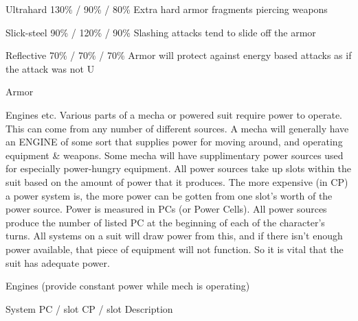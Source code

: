 \documentclass[twoside]{book}
\begin{document}
                      
                       Ultrahard   
                       130\% / 90\% / 80\%   
                         Extra hard armor fragments piercing
                         weapons 
                      
                      
                       Slick-steel   
                       90\% / 120\% / 90\%   
                         Slashing attacks tend to slide off the
                         armor 
                      
                      
                       Reflective   
                       70\% / 70\% / 70\%   
                          Armor will protect against energy based
                         attacks as if the attack was not U 
                      
                    
                  Armor  
                  
                
                
                Engines etc.  
                    Various parts of a mecha or powered suit
                   require power to operate. This can come from any
                   number of different sources. A mecha will generally
                   have an ENGINE of some sort that supplies power for
                   moving around, and operating equipment \& weapons.
                   Some mecha will have supplimentary power sources used
                   for especially power-hungry equipment. All power
                   sources take up slots within the suit based on the
                   amount of power that it produces. The more expensive
                   (in CP) a power system is, the more power can be
                   gotten from one slot's worth of the power
                   source. Power is measured in PCs (or Power Cells). All
                   power sources produce the number of listed PC at the
                   beginning of each of the character's turns. All
                   systems on a suit will draw power from this, and if
                   there isn't enough power available, that piece
                   of equipment will not function. So it is vital that
                   the suit has adequate power. 
                  
                    Engines (provide constant power while mech is
                     operating)
                    
                      
                       System   
                       PC / slot   
                       CP / slot   
                       Description   
                      
\end{document}
